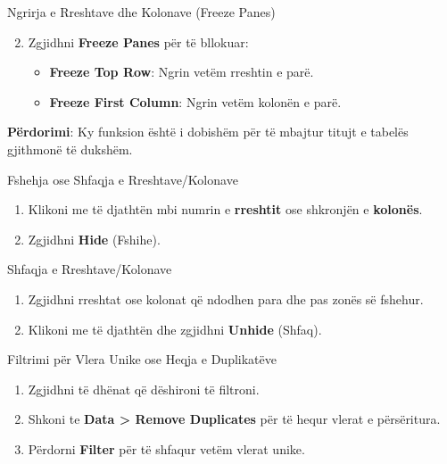 \documentclass[
  ignorenonframetext,
]{beamer}
\begin{document}
\begin{frame}{Ngrirja e Rreshtave dhe Kolonave (Freeze Panes)}
\label{ngrirja-e-rreshtave-dhe-kolonave-freeze-panes-2}
\begin{enumerate}
\setcounter{enumi}{1}
\item
  Zgjidhni \textbf{Freeze Panes} për të bllokuar:

  \begin{itemize}
  \item
    \textbf{Freeze Top Row}: Ngrin vetëm rreshtin e parë.
  \item
    \textbf{Freeze First Column}: Ngrin vetëm kolonën e parë.
  \end{itemize}
\end{enumerate}

\textbf{Përdorimi}: Ky funksion është i dobishëm për të mbajtur titujt e
tabelës gjithmonë të dukshëm.
\end{frame}

\begin{frame}{Fshehja ose Shfaqja e Rreshtave/Kolonave}
\label{fshehja-ose-shfaqja-e-rreshtavekolonave}
\begin{enumerate}
\item
  Klikoni me të djathtën mbi numrin e \textbf{rreshtit} ose shkronjën e
  \textbf{kolonës}.
\item
  Zgjidhni \textbf{Hide} (Fshihe).
\end{enumerate}
\end{frame}

\begin{frame}{Shfaqja e Rreshtave/Kolonave}
\label{shfaqja-e-rreshtavekolonave}
\begin{enumerate}
\item
  Zgjidhni rreshtat ose kolonat që ndodhen para dhe pas zonës së
  fshehur.
\item
  Klikoni me të djathtën dhe zgjidhni \textbf{Unhide} (Shfaq).
\end{enumerate}
\end{frame}

\begin{frame}{Filtrimi për Vlera Unike ose Heqja e Duplikatëve}
\label{filtrimi-puxebr-vlera-unike-ose-heqja-e-duplikatuxebve}
\begin{enumerate}
\item
  Zgjidhni të dhënat që dëshironi të filtroni.
\item
  Shkoni te \textbf{Data \textgreater{} Remove Duplicates} për të hequr
  vlerat e përsëritura.
\item
  Përdorni \textbf{Filter} për të shfaqur vetëm vlerat unike.
\end{enumerate}
\end{frame}
\end{document}
